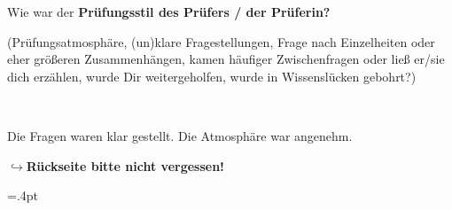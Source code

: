\documentclass[a4paper]{article}
\begin{document}
 \textbf{} Wie war der \textbf{Prüfungsstil des Prüfers / der Prüferin?} \\
 \begin{footnotesize} (Prüfungsatmosphäre, (un)klare Fragestellungen, Frage nach Einzelheiten oder eher größeren Zusammenhängen, kamen häufiger Zwischenfragen oder ließ er/sie dich erzählen, wurde Dir weitergeholfen, wurde in Wissenslücken gebohrt?)\end{footnotesize}  \\
 \begin{minipage}[t][10cm]{\linewidth}
    Die Fragen waren klar gestellt. Die Atmosphäre war angenehm.


 \end{minipage}

 \begin{flushright}$\hookrightarrow$\textbf{Rückseite bitte nicht vergessen!}\end{flushright}

 \newpage
 \columnseprule=.4pt
\end{document}
